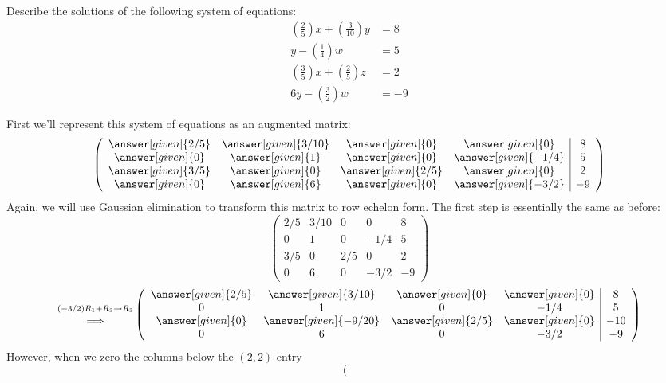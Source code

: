 \documentclass{ximera}
\begin{document}
\begin{example}[No solutions]
  Describe the solutions of the following system of equations:
  \begin{align*}
\left(\frac{2}{5}\right)x + \left(\frac{3}{10}\right) y &= 8\\
y -\left(\frac{1}{4}\right)w &= 5\\
\left(\frac{3}{5}\right)x + \left(\frac{2}{5}\right)z &= 2\\
6y - \left(\frac{3}{2}\right)w &= -9
\end{align*}
\begin{explanation}
First we'll represent this system of equations as an augmented matrix:
  \[
  \left(\begin{array}{cccc|c}
   \answer[given]{2/5}&  \answer[given]{3/10} & \answer[given]{0} &\answer[given]{0} &8 \\
  \answer[given]{0}&  \answer[given]{1} & \answer[given]{0} &\answer[given]{-1/4} & 5\\
  \answer[given]{3/5}&  \answer[given]{0} & \answer[given]{2/5} &\answer[given]{0} &2\\
  \answer[given]{0}&  \answer[given]{6} & \answer[given]{0} &\answer[given]{-3/2} &-9
\end{array}\right)
\]
Again, we will use Gaussian elimination to transform this matrix to
row echelon form. The first step is essentially the same as before:
\[
\left(\begin{array}{cccc|c}
   {2/5}&  {3/10} & {0} &{0} &8 \\
  {0}&  {1} & {0} &{-1/4} & 5\\
  {3/5}&  {0} & {2/5} &{0} &2\\
  {0}&  {6} & {0} &{-3/2} &-9
\end{array}\right)
\]
\[
\begin{matrix}
  \scriptstyle(-3/2) R_1 + R_3\to R_3\\
  \Longrightarrow
\end{matrix}
\left(\begin{array}{cccc|c}
   \answer[given]{2/5}&  \answer[given]{3/10} & \answer[given]{0} &\answer[given]{0} &8 \\
  {0}&  {1} & {0} &{-1/4} & 5\\
  \answer[given]{0}&  \answer[given]{-9/20} & \answer[given]{2/5} &\answer[given]{0} &-10\\
  {0}&  {6} & {0} &{-3/2} &-9
\end{array}\right)
\]
However, when we zero the columns below the $(2,2)$-entry
\[
\left(\begin{array}{cccc|c}

\end{array}\]
\end{explanation}
\end{example}
\end{document}
